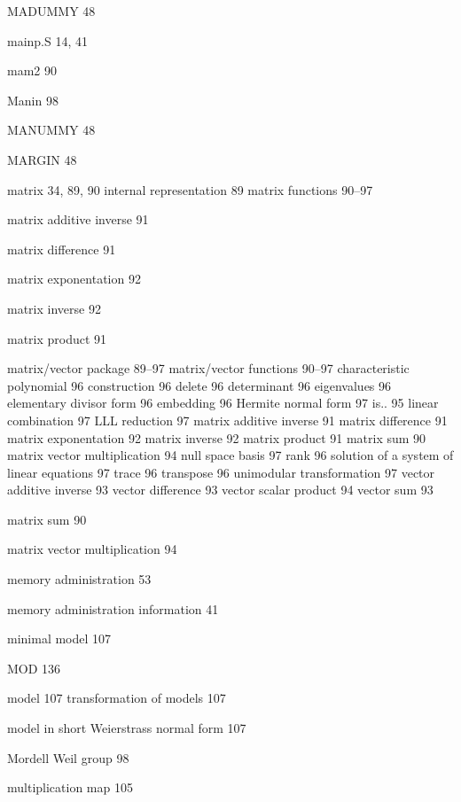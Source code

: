 \begin{theindex}
\indexspace

\item MADUMMY 48
\item mainp.S 14, 41
\item mam2 90
\item Manin 98
\item MANUMMY 48
\item MARGIN 48
\item matrix 34, 89, 90
  \subitem internal representation 89
  \subitem matrix functions 90--97
\item matrix additive inverse 91
\item matrix difference 91
\item matrix exponentation 92
\item matrix inverse 92
\item matrix product 91
\item matrix/vector package 89--97
  \subitem matrix/vector functions 90--97
    \subsubitem characteristic polynomial 96
    \subsubitem construction 96
    \subsubitem delete 96
    \subsubitem determinant 96
    \subsubitem eigenvalues 96
    \subsubitem elementary divisor form 96
    \subsubitem embedding 96
    \subsubitem Hermite normal form 97
    \subsubitem is.. 95
    \subsubitem linear combination 97
    \subsubitem LLL reduction 97
    \subsubitem matrix additive inverse 91
    \subsubitem matrix difference 91
    \subsubitem matrix exponentation 92
    \subsubitem matrix inverse 92
    \subsubitem matrix product 91
    \subsubitem matrix sum 90
    \subsubitem matrix vector multiplication 94
    \subsubitem null space basis 97
    \subsubitem rank 96
    \subsubitem solution of a system of linear equations 97
    \subsubitem trace 96
    \subsubitem transpose 96
    \subsubitem unimodular transformation 97
    \subsubitem vector additive inverse 93
    \subsubitem vector difference 93
    \subsubitem vector scalar product 94
    \subsubitem vector sum 93
\item matrix sum 90
\item matrix vector multiplication 94
\item memory administration 53
\item memory administration information 41
\item minimal model 107
\item MOD 136
\item model 107
  \subitem transformation of models 107
\item model in short Weierstrass normal form 107 
\item Mordell Weil group 98
\item multiplication map 105


\end{theindex}
